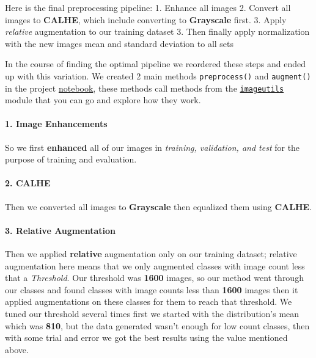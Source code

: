 \documentclass[11pt]{article}
\begin{document}
Here is the final preprocessing pipeline: 1. Enhance all images 2.
Convert all images to \textbf{CALHE}, which include converting to
\textbf{Grayscale} first. 3. Apply \emph{relative} augmentation to our
training dataset 3. Then finally apply normalization with the new images
mean and standard deviation to all sets

In the course of finding the optimal pipeline we reordered these steps
and ended up with this variation. We created 2 main methods
\texttt{preprocess()} and \texttt{augment()} in the project
\href{Traffic_Sign_Classifier.ipynb}{notebook}, these methods call
methods from the \href{imageutils.py}{\texttt{imageutils}} module that
you can go and explore how they work.

\hypertarget{image-enhancements}{%
\paragraph{1. Image Enhancements}\label{image-enhancements}}

So we first \textbf{enhanced} all of our images in \emph{training,
validation, and test} for the purpose of training and evaluation.

\hypertarget{calhe}{%
\paragraph{2. CALHE}\label{calhe}}

Then we converted all images to \textbf{Grayscale} then equalized them
using \textbf{CALHE}.

\hypertarget{relative-augmentation}{%
\paragraph{3. Relative Augmentation}\label{relative-augmentation}}

Then we applied \textbf{relative} augmentation only on our training
dataset; relative augmentation here means that we only augmented classes
with image count less that a \emph{Threshold}. Our threshold was
\textbf{1600} images, so our method went through our classes and found
classes with image counts less than \textbf{1600} images then it applied
augmentations on these classes for them to reach that threshold. We
tuned our threshold several times first we started with the
distribution's mean which was \textbf{810}, but the data generated
wasn't enough for low count classes, then with some trial and error we
got the best results using the value mentioned above.
\end{document}
